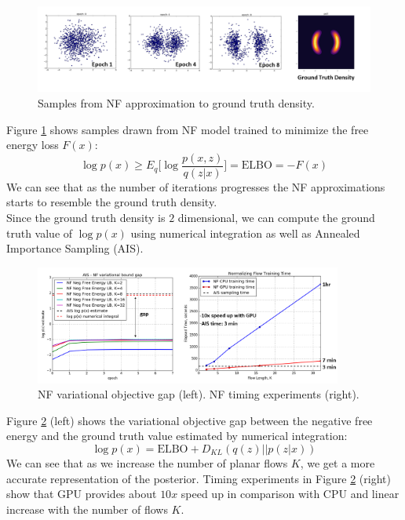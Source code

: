 \begin{figure}[thpb]
    \centering
    \includegraphics[width=\textwidth, trim={10 10 10 10}]{figures/nf_exp1.png}
    \caption{Samples from NF approximation to ground truth density.}
    \label{fig:nf_exp1}
\end{figure}

Figure \ref{fig:nf_exp1} shows samples drawn from NF model trained to minimize the free energy loss $F(x)$:
\begin{equation}
    \log p(x) \geq E_q\bigg[\log \frac{p(x,z)}{q(z|x)}\bigg] = \mathrm{ELBO} = -F(x)
\end{equation}
We can see that as the number of iterations progresses the NF approximations starts to resemble the ground truth density.\\

Since the ground truth density is $2$ dimensional, we can compute the ground truth value of $\log p(x)$ using numerical integration as well as Annealed Importance Sampling (AIS).

\begin{figure}[thpb]
    \centering
    \includegraphics[width=0.9\textwidth, trim={10 10 10 10}]{figures/nf_exp2.png}
    \caption{NF variational objective gap (left). NF timing experiments (right).}
    \label{fig:nf_exp2}
\end{figure}

Figure \ref{fig:nf_exp2} (left) shows the variational objective gap between the negative free energy and the ground truth value estimated by numerical integration:
\begin{equation}
    \log p(x) = \mathrm{ELBO} + D_{KL}(q(z)||p(z|x))
\end{equation}
We can see that as we increase the number of planar flows $K$, we get a more accurate representation of the posterior. Timing experiments in Figure \ref{fig:nf_exp2} (right) show that GPU provides about $10x$ speed up in comparison with CPU and linear increase with the number of flows $K$.\\

